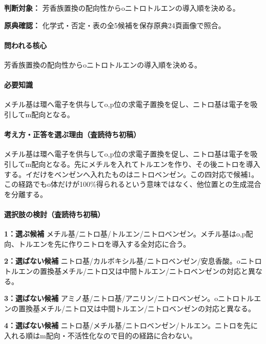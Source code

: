 \noindent\textbf{判断対象：} 芳香族置換の配向性からoニトロトルエンの導入順を決める。\par

\noindent\textbf{原典確認：} 化学式・否定・表の全5候補を保存原典24頁画像で照合。\par

\paragraph{問われる核心} 芳香族置換の配向性からoニトロトルエンの導入順を決める。

\paragraph{必要知識} メチル基は環へ電子を供与してo,p位の求電子置換を促し、ニトロ基は電子を吸引してm配向となる。

\paragraph{考え方・正答を選ぶ理由（査読待ち初稿）} メチル基は環へ電子を供与してo,p位の求電子置換を促し、ニトロ基は電子を吸引してm配向となる。先にメチルを入れてトルエンを作り、その後ニトロを導入する。イだけをベンゼンへ入れたものはニトロベンゼン。この四対応で候補1。この経路でもo体だけが100\%得られるという意味ではなく、他位置との生成混合を分離する。

\paragraph{選択肢の検討（査読待ち初稿）}\mbox{}\par

\noindent\textbf{1：選ぶ候補} メチル基/ニトロ基/トルエン/ニトロベンゼン。メチル基はo,p配向、トルエンを先に作りニトロを導入する全対応に合う。\par

\noindent\textbf{2：選ばない候補} ニトロ基/カルボキシル基/ニトロベンゼン/安息香酸。oニトロトルエンの置換基メチル/ニトロ又は中間トルエン/ニトロベンゼンの対応と異なる。\par

\noindent\textbf{3：選ばない候補} アミノ基/ニトロ基/アニリン/ニトロベンゼン。oニトロトルエンの置換基メチル/ニトロ又は中間トルエン/ニトロベンゼンの対応と異なる。\par

\noindent\textbf{4：選ばない候補} ニトロ基/メチル基/ニトロベンゼン/トルエン。ニトロを先に入れる順はm配向・不活性化なので目的の経路に合わない。\par

